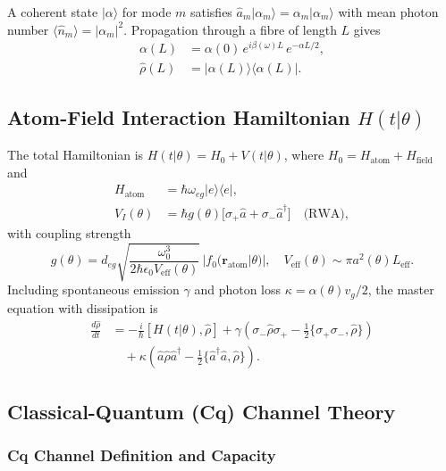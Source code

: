 \documentclass[journal,twocolumn]{IEEEtran}
\theoremstyle{definition}
\theoremstyle{plain}
\begin{document}
A coherent state $|\alpha\rangle$ for mode $m$ satisfies
$\hat{a}_m|\alpha_m\rangle=\alpha_m|\alpha_m\rangle$ with mean photon
number $\langle\hat{n}_m\rangle=|\alpha_m|^2$. Propagation through a
fibre of length $L$ gives
\begin{align}
  \alpha(L) &= \alpha(0)\,e^{i\beta(\omega)L}\,e^{-\alpha L/2},
  \nonumber\\
  \hat{\rho}(L) &= |\alpha(L)\rangle\langle\alpha(L)|.
  \label{eq:coherent_propagation}
\end{align}

\subsection{Atom-Field Interaction Hamiltonian $H(t|\theta)$}

The total Hamiltonian is $H(t|\theta)=H_0+V(t|\theta)$, where
$H_0=H_{\mathrm{atom}}+H_{\mathrm{field}}$ and
\begin{align}
  H_{\mathrm{atom}} &= \hbar\omega_{eg}|e\rangle\langle e|,\nonumber\\
  V_I(\theta) &= \hbar g(\theta)\bigl[\sigma_+\hat{a}
    +\sigma_-\hat{a}^\dagger\bigr]\quad\text{(RWA)},
\end{align}
with coupling strength
\begin{equation}
  g(\theta)=d_{eg}\sqrt{\frac{\omega_0^3}{2\hbar\epsilon_0
  V_{\mathrm{eff}}(\theta)}}\,|f_0(\mathbf{r}_{\mathrm{atom}}|\theta)|,
  \quad V_{\mathrm{eff}}(\theta)\sim\pi a^2(\theta)L_{\mathrm{eff}}.
  \label{eq:coupling_strength}
\end{equation}
Including spontaneous emission $\gamma$ and photon loss
$\kappa=\alpha(\theta)v_g/2$, the master equation with dissipation is
\begin{align}
  \frac{d\hat\rho}{dt} &= -\frac{i}{\hbar}[H(t|\theta),\hat\rho]
  +\gamma\!\left(\sigma_-\hat\rho\sigma_+
  -\tfrac{1}{2}\{\sigma_+\sigma_-,\hat\rho\}\right)\nonumber\\
  &\quad+\kappa\!\left(\hat{a}\hat\rho\hat{a}^\dagger
  -\tfrac{1}{2}\{\hat{a}^\dagger\hat{a},\hat\rho\}\right).
\end{align}

\subsection{Classical-Quantum (Cq) Channel Theory}

\subsubsection{Cq Channel Definition and Capacity}
\end{document}
